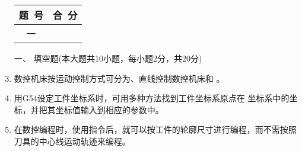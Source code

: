 \documentclass[12pt,twocolumn,landscape,UTF8,twoside]{ctexart}
\begin{document}
\begin{spacing}{1.3}
	\begin{enumerate} [1、]
		
\item[\heiti \begin{minipage}{\@}\begin{tabular}{|c|c|}
\hline	题~号 & 合~分\\ \hline 一& \\\hline\end{tabular}	\end{minipage} ]
	
\item [\heiti 一、 ]{\heiti 填空题(本大题共10小题，每小题2分，共20分)}
		
		\item 数控机床按运动控制方式可分为、直线控制数控机床和	。
		
		
		
		

		\item 用G54设定工件坐标系时，可用多种方法找到工件坐标系原点在 坐标系中的坐标，并把其坐标值输入到相应的参数中。


		\item 在数控编程时，使用指令后，就可以按工件的轮廓尺寸进行编程，而不需按照刀具的中心线运动轨迹来编程。
		



\end{enumerate}
\end{spacing}
\end{document}
